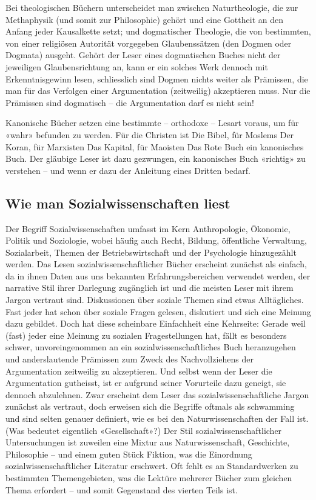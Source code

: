 \documentclass[a4paper,11pt]{scrartcl}
\begin{document}
Bei theologischen Büchern unterscheidet man zwischen Naturtheologie, die zur Methaphysik (und somit zur Philosophie) gehört und eine Gottheit an den Anfang jeder Kausalkette setzt; und dogmatischer Theologie, die von bestimmten, von einer religiösen Autorität vorgegeben Glaubenssätzen (den Dogmen oder Dogmata) ausgeht. Gehört der Leser eines dogmatischen Buches nicht der jeweiligen Glaubensrichtung an, kann er ein solches Werk dennoch mit Erkenntnisgewinn lesen, schliesslich sind Dogmen nichts weiter als Prämissen, die man für das Verfolgen einer Argumentation (zeitweilig) akzeptieren muss. Nur die Prämissen sind dogmatisch – die Argumentation darf es nicht sein!

Kanonische Bücher setzen eine bestimmte – orthodoxe – Lesart voraus, um für «wahr» befunden zu werden. Für die Christen ist Die Bibel, für Moslems Der Koran, für Marxisten Das Kapital, für Maoisten Das Rote Buch ein kanonisches Buch. Der gläubige Leser ist dazu gezwungen, ein kanonisches Buch «richtig» zu verstehen – und wenn er dazu der Anleitung eines Dritten bedarf.

\subsection{Wie man Sozialwissenschaften liest}

Der Begriff Sozialwissenschaften umfasst im Kern Anthropologie, Ökonomie, Politik und Soziologie, wobei häufig auch Recht, Bildung, öffentliche Verwaltung, Sozialarbeit, Themen der Betriebswirtschaft und der Psychologie hinzugezählt werden. Das Lesen sozialwissenschaftlicher Bücher erscheint zunächst als einfach, da in ihnen Daten aus uns bekannten Erfahrungsbereichen verwendet werden, der narrative Stil ihrer Darlegung zugänglich ist und die meisten Leser mit ihrem Jargon vertraut sind. Diskussionen über soziale Themen sind etwas Alltägliches. Fast jeder hat schon über soziale Fragen gelesen, diskutiert und sich eine Meinung dazu gebildet. Doch hat diese scheinbare Einfachheit eine Kehrseite: Gerade weil (fast) jeder eine Meinung zu sozialen Fragestellungen hat, fällt es besonders schwer, unvoreingenommen an ein sozialwissenschaftliches Buch heranzugehen und anderslautende Prämissen zum Zweck des Nachvollziehens der Argumentation zeitweilig zu akzeptieren. Und selbst wenn der Leser die Argumentation gutheisst, ist er aufgrund seiner Vorurteile dazu geneigt, sie dennoch abzulehnen. Zwar erscheint dem Leser das sozialwissenschaftliche Jargon zunächst als vertraut, doch erweisen sich die Begriffe oftmals als schwamming und sind selten genauer definiert, wie es bei den Naturwissenschaften der Fall ist. (Was bedeutet eigentlich «Gesellschaft»?) Der Stil sozialwissenschaftlicher Untersuchungen ist zuweilen eine Mixtur aus Naturwissenschaft, Geschichte, Philosophie – und einem guten Stück Fiktion, was die Einordnung sozialwissenschaftlicher Literatur erschwert. Oft fehlt es an Standardwerken zu bestimmten Themengebieten, was die Lektüre mehrerer Bücher zum gleichen Thema erfordert – und somit Gegenstand des vierten Teils ist.
\end{document}
